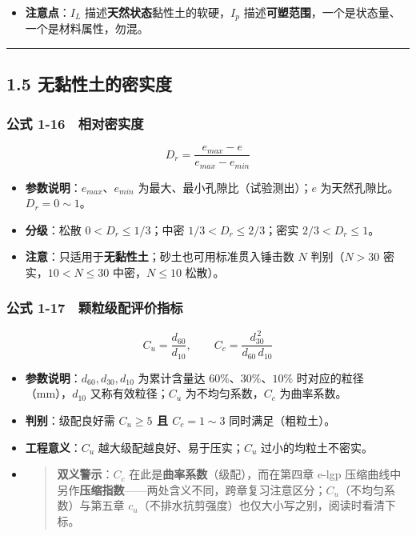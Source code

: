 \documentclass[
]{article}
\providecommand{\tightlist}{%
  \setlength{\itemsep}{0pt}\setlength{\parskip}{0pt}}
\begin{document}
\begin{itemize}
\tightlist
\item
  \textbf{注意点}：\(I_L\) 描述\textbf{天然状态}黏性土的软硬，\(I_p\)
  描述\textbf{可塑范围}，一个是状态量、一个是材料属性，勿混。
\end{itemize}

\begin{center}\rule{0.5\linewidth}{0.5pt}\end{center}

\subsection{1.5
无黏性土的密实度}\label{ux65e0ux9ecfux6027ux571fux7684ux5bc6ux5b9eux5ea6}

\subsubsection{公式
1-16　相对密实度}\label{ux516cux5f0f-1-16-ux76f8ux5bf9ux5bc6ux5b9eux5ea6}

\[D_r=\frac{e_{max}-e}{e_{max}-e_{min}}\]

\begin{itemize}
\tightlist
\item
  \textbf{参数说明}：\(e_{max}\)、\(e_{min}\)
  为最大、最小孔隙比（试验测出）；\(e\) 为天然孔隙比。\(D_r=0\sim1\)。
\item
  \textbf{分级}：松散 \(0<D_r\le1/3\)；中密 \(1/3<D_r\le2/3\)；密实
  \(2/3<D_r\le1\)。
\item
  \textbf{注意}：只适用于\textbf{无黏性土}；砂土也可用标准贯入锤击数
  \(N\) 判别（\(N>30\) 密实，\(10<N\le30\) 中密，\(N\le10\) 松散）。
\end{itemize}

\subsubsection{公式
1-17　颗粒级配评价指标}\label{ux516cux5f0f-1-17-ux9897ux7c92ux7ea7ux914dux8bc4ux4ef7ux6307ux6807}

\[C_u=\frac{d_{60}}{d_{10}},\qquad C_c=\frac{d_{30}^{\,2}}{d_{60}\,d_{10}}\]

\begin{itemize}
\item
  \textbf{参数说明}：\(d_{60},d_{30},d_{10}\) 为累计含量达
  \(60\%\text{、}30\%\text{、}10\%\) 时对应的粒径（mm），\(d_{10}\)
  又称有效粒径；\(C_u\) 为不均匀系数，\(C_c\) 为曲率系数。
\item
  \textbf{判别}：级配良好需 \textbf{\(C_u\ge5\) 且 \(C_c=1\sim3\)}
  同时满足（粗粒土）。
\item
  \textbf{工程意义}：\(C_u\) 越大级配越良好、易于压实；\(C_u\)
  过小的均粒土不密实。
\item
  \begin{quote}
  \textbf{双义警示}：\(C_c\) 在此是\textbf{曲率系数}（级配），而在第四章
  e-lgp
  压缩曲线中另作\textbf{压缩指数}------两处含义不同，跨章复习注意区分；\(C_u\)（不均匀系数）与第五章
  \(c_u\)（不排水抗剪强度）也仅大小写之别，阅读时看清下标。
  \end{quote}
\end{itemize}
\end{document}
